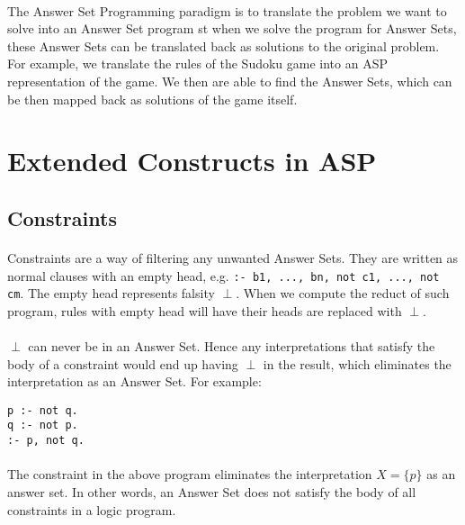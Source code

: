 \documentclass{article}
\theoremstyle{plain}
\theoremstyle{definition}
\begin{document}
\begin{multicols}{2}
\paragraph{} The Answer Set Programming paradigm is to translate the problem we want to solve into an Answer Set program st when we solve the program for Answer Sets, these Answer Sets can be translated back as solutions to the original problem. For example, we translate the rules of the Sudoku game into an ASP representation of the game. We then are able to find the Answer Sets, which can be then mapped back as solutions of the game itself.

\section{Extended Constructs in ASP}

\subsection{Constraints}

\paragraph{} Constraints are a way of filtering any unwanted Answer Sets. They are written as normal clauses with an empty head, e.g. \lstinline{:- b1, ..., bn, not c1, ..., not cm}. The empty head represents falsity $\perp$. When we compute the reduct of such program, rules with empty head will have their heads are replaced with $\perp$. 

\paragraph{} $\perp$ can never be in an Answer Set. Hence any interpretations that satisfy the body of a constraint would end up having $\perp$ in the result, which eliminates the interpretation as an Answer Set. For example:

\begin{lstlisting}
p :- not q.
q :- not p.
:- p, not q.
\end{lstlisting}

\paragraph{} The constraint in the above program eliminates the interpretation $X = \{p\}$ as an answer set. In other words, an Answer Set does not satisfy the body of all constraints in a logic program.


\end{multicols}
\end{document}

